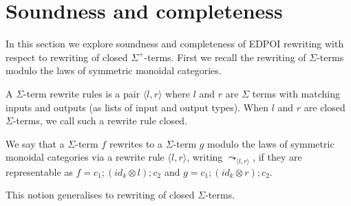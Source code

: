 \section{Soundness and completeness}

In this section we explore soundness and completeness of EDPOI rewriting with respect to rewriting of closed $\Sigma^{+}$-terms.
First we recall the rewriting of $\Sigma$-terms modulo the laws of symmetric monoidal categories.

\begin{definition}
	A $\Sigma$-term rewrite rules is a pair $\langle l, r \rangle$ where $l$ and $r$ are $\Sigma$ terms with matching inputs and outputs (as lists of input and output types).
	When $l$ and $r$ are closed $\Sigma$-terms, we call such a rewrite rule closed.
\end{definition}

\begin{definition}%
	\label{def:rewrite}
	We say that a $\Sigma$-term $f$ rewrites to a $\Sigma$-term $g$ modulo the laws of symmetric monoidal categories via a rewrite rule $\langle l, r \rangle$, writing $\leadsto_{\langle l, r \rangle}$, if they are representable as
	$
		f = c_{1};(id_{k} \otimes l);c_{2} $ and $ g = c_{1};(id_{k} \otimes r);c_{2}
	$.
\end{definition}
This notion generalises to rewriting of closed $\Sigma$-terms.

